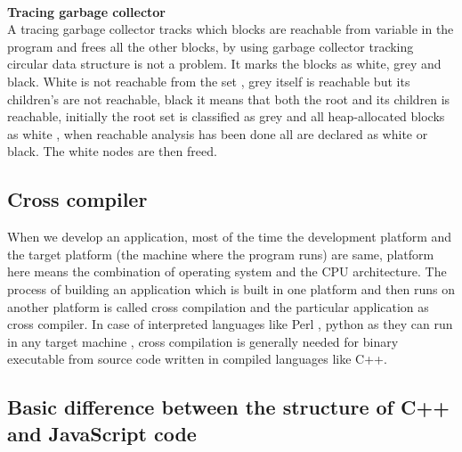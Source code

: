 \documentclass[23pt]{article}
\begin{document}
{\\ \textbf{Tracing garbage collector} \\
A tracing garbage collector tracks which blocks are reachable from variable in the program and frees all the other blocks, by using garbage collector tracking circular data structure is not a problem. It marks the blocks as white, grey and black. White is not reachable from the set , grey itself is reachable but its children’s are not reachable, black it means that both the root and its children is reachable, initially the root set is classified as grey and all heap-allocated blocks as white , when reachable analysis has been done all are declared as white or black. The white nodes are then freed. \cite{compilerback}  \par}

\subsection{Cross compiler}

{\Large When we develop an application, most of the time the development platform and the target platform (the machine where the program runs) are same, platform here means the combination of operating system and the CPU architecture. The process of building an application which is built in one platform and then runs on another platform is called cross compilation and the particular application as cross compiler. In case of interpreted languages like Perl , python as they can run in any target machine , cross compilation is generally needed for binary executable from source code written in compiled languages like C++. \cite{crossplatform} \par}

\subsection{Basic difference between the structure of C++ and JavaScript code}
\end{document}
